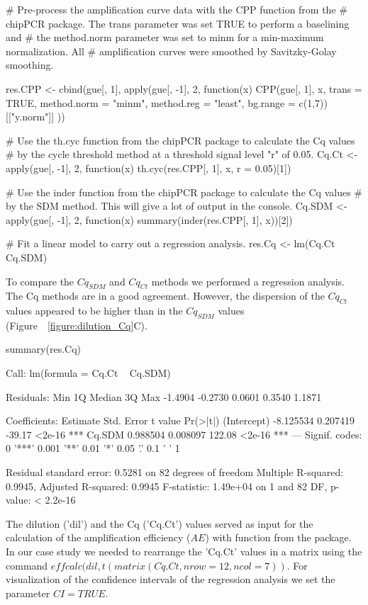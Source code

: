\begin{example}
# Pre-process the amplification curve data with the CPP function from the 
# chipPCR package. The trans parameter was set TRUE to perform a baselining and 
# the method.norm parameter was set to minm for a min-maximum normalization. All
# amplification curves were smoothed by Savitzky-Golay smoothing.

res.CPP <- cbind(gue[, 1], apply(gue[, -1], 2, function(x) {
  CPP(gue[, 1], x, trans = TRUE, method.norm = "minm", method.reg = "least", 
      bg.range = c(1,7))[["y.norm"]]
}))

# Use the th.cyc function from the chipPCR package to calculate the Cq values
# by the cycle threshold method at a threshold signal level "r" of 0.05.
Cq.Ct <- apply(gue[, -1], 2, function(x) 
  th.cyc(res.CPP[, 1], x, r = 0.05)[1])

# Use the inder function from the chipPCR package to calculate the Cq values
# by the SDM method. This will give a lot of output in the console.
Cq.SDM <- apply(gue[, -1], 2, function(x)
  summary(inder(res.CPP[, 1], x))[2])

# Fit a linear model to carry out a regression analysis.
res.Cq <- lm(Cq.Ct ~ Cq.SDM)
\end{example}

To compare the $Cq_{SDM}$ and $Cq_{Ct}$ methods we performed a regression 
analysis. The Cq methods are in a good agreement. However, the dispersion of the 
$Cq_{Ct}$ values appeared to be higher than in the $Cq_{SDM}$ values 
(Figure~~\ref{figure:dilution_Cq}C).

\begin{example}
summary(res.Cq)

Call:
lm(formula = Cq.Ct ~ Cq.SDM)

Residuals:
    Min      1Q  Median      3Q     Max 
-1.4904 -0.2730  0.0601  0.3540  1.1871 

Coefficients:
             Estimate Std. Error t value Pr(>|t|)    
(Intercept) -8.125534   0.207419  -39.17   <2e-16 ***
Cq.SDM       0.988504   0.008097  122.08   <2e-16 ***
---
Signif. codes:  0 '***' 0.001 '**' 0.01 '*' 0.05 '.' 0.1 ' ' 1

Residual standard error: 0.5281 on 82 degrees of freedom
Multiple R-squared:  0.9945,  Adjusted R-squared:  0.9945 
F-statistic: 1.49e+04 on 1 and 82 DF,  p-value: < 2.2e-16
\end{example}

The dilution ('dil') and the Cq ('Cq.Ct') values served as input for the 
calculation of the amplification efficiency ($AE$) with  function 
from the  package. In our case study we needed to rearrange the 
'Cq.Ct' values in a matrix using the command $effcalc(dil, t(matrix(Cq.Ct, 
nrow = 12, ncol = 7))$. For visualization of the confidence intervals of the 
regression analysis we set the parameter $CI = TRUE$.

